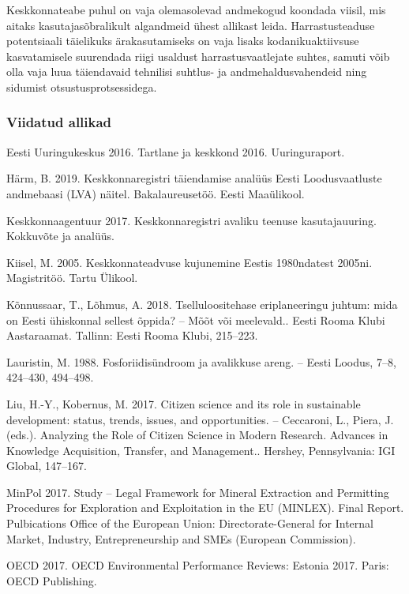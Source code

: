 \documentclass[estonian,]{article}
\begin{document}
Keskkonnateabe puhul on vaja olemasolevad andmekogud koondada viisil, mis aitaks kasutajasõbralikult algandmeid ühest allikast leida. Harrastusteaduse potentsiaali täielikuks ärakasutamiseks on vaja lisaks kodanikuaktiivsuse kasvatamisele suurendada riigi usaldust harrastusvaatlejate suhtes, samuti võib olla vaja luua täiendavaid tehnilisi suhtlus- ja andmehaldusvahendeid ning sidumist otsustusprotsessidega.

\hypertarget{viidatud-allikad-15}{%
\subsubsection*{Viidatud allikad}\label{viidatud-allikad-15}}

Eesti Uuringukeskus 2016. Tartlane ja keskkond 2016. Uuringuraport.

Härm, B. 2019. Keskkonnaregistri täiendamise analüüs Eesti Loodusvaatluste andmebaasi (LVA) näitel. Bakalaureusetöö. Eesti Maaülikool.

Keskkonnaagentuur 2017. Keskkonnaregistri avaliku teenuse kasutajauuring. Kokkuvõte ja analüüs.

Kiisel, M. 2005. Keskkonnateadvuse kujunemine Eestis 1980ndatest 2005ni. Magistritöö. Tartu Ülikool.

Kõnnussaar, T., Lõhmus, A. 2018. Tselluloositehase eriplaneeringu juhtum: mida on Eesti ühiskonnal sellest õppida? -- Mõõt või meelevald.. Eesti Rooma Klubi Aastaraamat. Tallinn: Eesti Rooma Klubi, 215--223.

Lauristin, M. 1988. Fosforiidisündroom ja avalikkuse areng. -- Eesti Loodus, 7--8, 424--430, 494--498.

Liu, H.-Y., Kobernus, M. 2017. Citizen science and its role in sustainable development: status, trends, issues, and opportunities. -- Ceccaroni, L., Piera, J. (eds.). Analyzing the Role of Citizen Science in Modern Research. Advances in Knowledge Acquisition, Transfer, and Management.. Hershey, Pennsylvania: IGI Global, 147--167.

MinPol 2017. Study -- Legal Framework for Mineral Extraction and Permitting Procedures for Exploration and Exploitation in the EU (MINLEX). Final Report. Pulbications Office of the European Union: Directorate-General for Internal Market, Industry, Entrepreneurship and SMEs (European Commission).

OECD 2017. OECD Environmental Performance Reviews: Estonia 2017. Paris: OECD Publishing.
\end{document}
